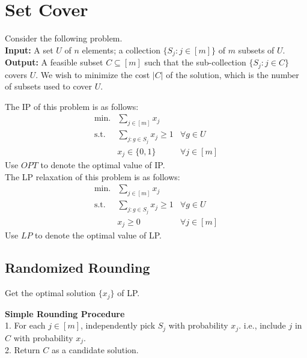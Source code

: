 \section{Set Cover}
\begin{definition}
Consider the following problem.\\
\textbf{Input:} A set $U$ of $n$ elements; a collection $\{S_j: j\in [m]\}$ of $m$ subsets of $U$.\\
\textbf{Output:} A feasible subset $C\subseteq [m]$ such that the sub-collection $\{S_j: j\in C\}$ covers $U$. We wish to minimize the cost $|C|$ of the solution, which is the number of subsets used to cover $U$.
\end{definition}
The IP of this problem is as follows:
\begin{align}
   \nonumber \text{min.} &\sum_{j \in [m]}x_j&\\
    \nonumber \text{s.t.}&\sum_{j:g\in S_j}x_j \ge 1 & \forall g\in U\\
    \nonumber &x_j \in \{0,1\} & \forall j\in[m]
\end{align}
Use $OPT$ to denote the optimal value of IP.\\
The LP relaxation of this problem is as follows:
\begin{align}
   \nonumber \text{min.} &\sum_{j \in [m]}x_j&\\
    \nonumber \text{s.t.}&\sum_{j:g\in S_j}x_j \ge 1 & \forall g\in U\\
    \nonumber &x_j \ge 0 & \forall j\in[m]
\end{align}
Use $LP$ to denote the optimal value of LP.
\subsection {Randomized Rounding}\label{rr}
Get the optimal solution $\{x_j\}$ of LP.

\noindent\textbf{Simple Rounding Procedure}\\
1. For each $j \in [m]$, independently pick $S_j$ with probability $x_j$. i.e., include $j$ in $C$ with probability $x_j$.\\
2. Return $C$ as a candidate solution. 

